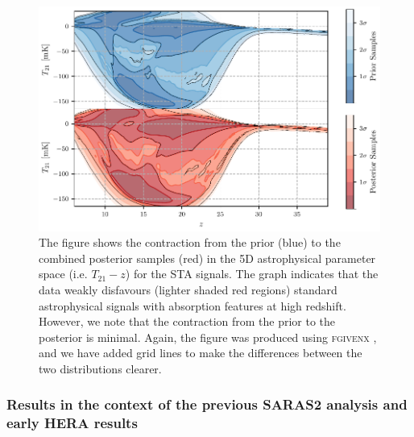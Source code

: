 
\begin{figure}
    \centering
    \includegraphics{saras2/figs/fgivenx_signals_nlive_500_lah_only.pdf}
    \caption{The figure shows the contraction from the prior (blue) to the combined posterior samples (red) in the 5D astrophysical parameter space (i.e. $T_{21} - z$) for the STA signals. The graph indicates that the data weakly disfavours (lighter shaded red regions) standard astrophysical signals with absorption features at high redshift. However, we note that the contraction from the prior to the posterior is minimal. Again, the figure was produced using \textsc{fgivenx} \protect\citep{fgivenx}, and we have added grid lines to make the differences between the two distributions clearer.}
    \label{fig:fgivenx_lah}
\end{figure}

\subsubsection{Results in the context of the previous SARAS2 analysis and early HERA results}
\label{sec:comparison}

